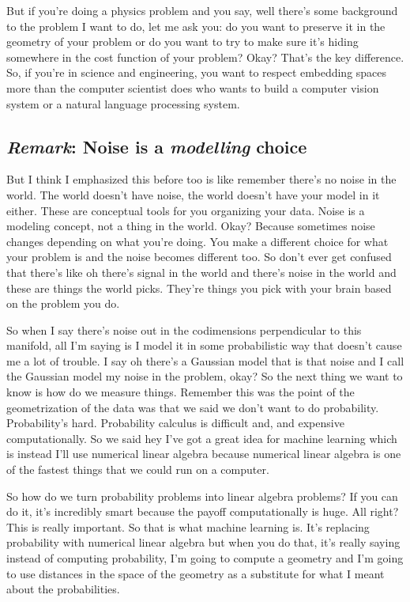 But if you're doing a physics problem and you say, well there's some background to the problem I want to do, let me ask you: do you want to preserve it in the geometry of your problem or do you want to try to make sure it's hiding somewhere in the cost function of your problem? Okay? That's the key difference. So, if you're in science and engineering, you want to respect embedding spaces more than the computer scientist does who wants to build a computer vision system or a natural language processing system. 

\subsection{\textit{Remark}: Noise is a \textit{modelling} choice}
But I think I emphasized this before too is like remember there's no noise in the world. The world doesn't have noise, the world doesn't have your model in it either. These are conceptual tools for you organizing your data. Noise is a modeling concept, not a thing in the world. Okay? Because sometimes noise changes depending on what you're doing. You make a different choice for what your problem is and the noise becomes different too. So don't ever get confused that there's like oh there's signal in the world and there's noise in the world and these are things the world picks. They're things you pick with your brain based on the problem you do. 

So when I say there's noise out in the codimensions perpendicular to this manifold, all I'm saying is I model it in some probabilistic way that doesn't cause me a lot of trouble. I say oh there's a Gaussian model that is that noise and I call the Gaussian model my noise in the problem, okay? So the next thing we want to know is how do we measure things. Remember this was the point of the geometrization of the data was that we said we don't want to do probability. Probability's hard. Probability calculus is difficult and, and expensive computationally. So we said hey I've got a great idea for machine learning which is instead I'll use numerical linear algebra because numerical linear algebra is one of the fastest things that we could run on a computer. 

So how do we turn probability problems into linear algebra problems? If you can do it, it's incredibly smart because the payoff computationally is huge. All right? This is really important. So that is what machine learning is. It's replacing probability with numerical linear algebra but when you do that, it's really saying instead of computing probability, I'm going to compute a geometry and I'm going to use distances in the space of the geometry as a substitute for what I meant about the probabilities. 


